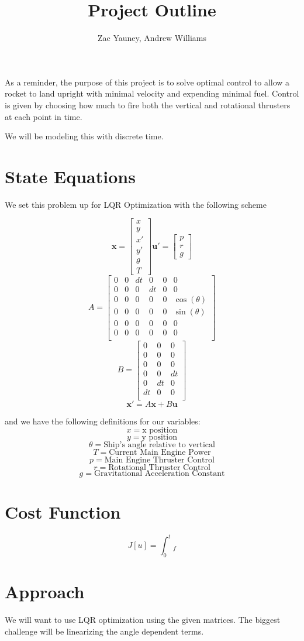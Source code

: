 \documentclass{article}
\title{Project Outline}
\author{Zac Yauney, Andrew Williams}
\begin{document}
\maketitle

As a reminder, the purpose of this project is to solve optimal control to allow a rocket to land upright with minimal velocity and expending minimal fuel. Control is given by choosing how much to fire both the vertical and rotational thrusters at each point in time.

We will be modeling this with discrete time.

\section{State Equations}

We set this problem up for LQR Optimization with the following scheme

\[
	\mathbf{x} =
	\begin{bmatrix}
		x\\
		y\\
		x'\\
		y'\\
		\theta\\
		T
\end{bmatrix}
\mathbf{u}' =
	\begin{bmatrix}
		p\\
		r\\
		g
\end{bmatrix}
\]
\[
	A=\begin{bmatrix}
		0 &0 &dt &0 &0 &0\\
		0 &0 &0 &dt &0 &0\\
		0 &0 &0 &0 &0 &\cos(\theta)\\
		0 &0 &0 &0 &0 &\sin(\theta)\\
		0 &0 &0 &0 &0 &0\\
		0 &0 &0 &0 &0 &0\\
\end{bmatrix}
\]
\[
	B=\begin{bmatrix}
		0 &0 &0 \\
		0 &0 &0 \\
		0 &0 &0 \\
		0 &0 &dt \\
		0 &dt &0 \\
		dt &0 &0 \\
\end{bmatrix}
\]
\[
	\mathbf{x}' = A\mathbf{x} + B\mathbf{u}
\]


and we have the following definitions for our variables:
\[
 x = \text{x position}
\]
\[
 y = \text{y position}
\]
\[
 \theta = \text{Ship's angle relative to vertical}
\]
\[
 T = \text{Current Main Engine Power}
\]
\[
	p = \text{Main Engine Thruster Control}
\]
\[
	r = \text{Rotational Thruster Control}
\]
\[
	g = \text{Gravitational Acceleration Constant}
\]


\section{Cost Function}

\[
	J[u] = \int_0^t_f

\]


\section{Approach}
We will want to use LQR optimization using the given matrices. The biggest challenge will be linearizing the angle dependent terms.
\end{document}
